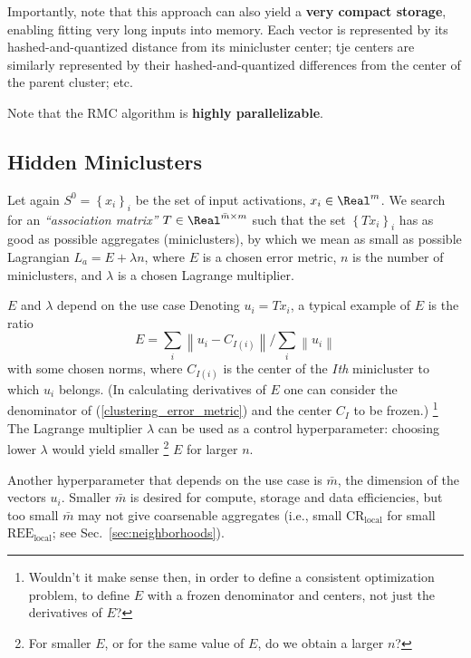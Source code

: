 \documentclass{article} %
\begin{document}
Importantly, note that this approach can also yield a {\bf very compact storage}, enabling fitting very long inputs into memory. Each vector is represented by its hashed-and-quantized distance from its minicluster center; tje centers are similarly represented by their hashed-and-quantized differences from the center of the parent cluster; etc.

Note that the RMC algorithm is {\bf highly parallelizable}.

\subsection{Hidden Miniclusters}
\label{sec:G.4}
Let again $S^0 = \left\{x_i\right\}_i$ be the set of input activations, $x_i \in \Real^m$. We search for an {\it ``association matrix''} $T \in \Real^{\bar{m} \times m}$ such that the set $\left\{T x_i\right\}_i$ has as good as possible aggregates (miniclusters), by which we mean as small as possible Lagrangian $L_a = E + \lambda n$, where $E$ is a chosen error metric, $n$ is the number of miniclusters, and $\lambda$ is a chosen Lagrange multiplier.

$E$ and $\lambda$ depend on the use case Denoting $u_i = T x_i$, a typical example of $E$ is the ratio
\begin{equation}
    E = \sum_i \left\| u_i - C_{I(i)} \right\| / \sum_i \left\| u_i \right\|
    \label{clustering_error_metric}
\end{equation}
with some chosen norms, where $C_{I(i)}$ is the center of the $I${\it th} minicluster to which $u_i$ belongs. (In calculating derivatives of $E$ one can consider the denominator of (\ref{clustering_error_metric}) and the center $C_I$ to be frozen.) \footnote{Wouldn't it make sense then, in order to define a consistent optimization problem, to define $E$ with a frozen denominator and centers, not just the derivatives of $E$?} The Lagrange multiplier $\lambda$ can be used as a control hyperparameter: choosing lower $\lambda$ would yield smaller \footnote{For smaller $E$, or for the same value of $E$, do we obtain a larger $n$?} $E$ for larger $n$.

Another hyperparameter that depends on the use case is $\bar{m}$, the dimension of the vectors $u_i$. Smaller $\bar{m}$ is desired for compute, storage and data efficiencies, but too small $\bar{m}$ may not give coarsenable aggregates (i.e., small $\text{CR}_{\text{local}}$ for small $\text{REE}_{\text{local}}$; see Sec.~\ref{sec:neighborhoods}).
\end{document}
